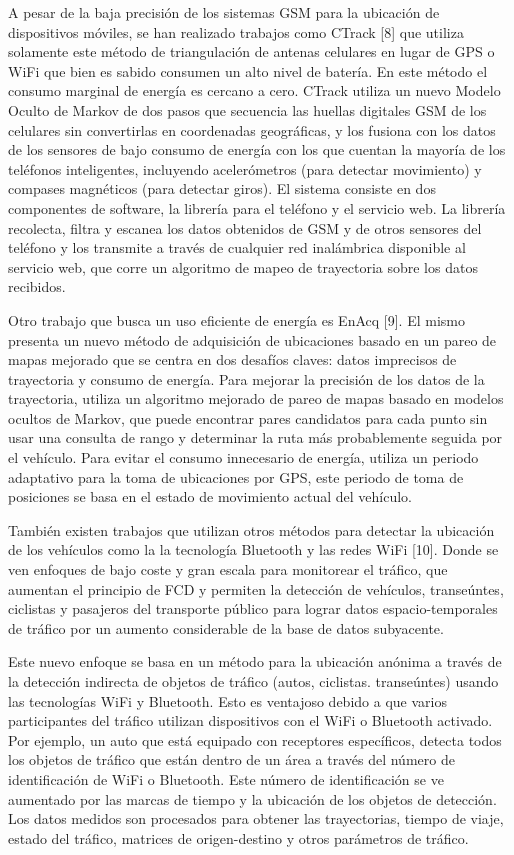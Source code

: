 A pesar de la baja precisión de los sistemas GSM para la ubicación de dispositivos móviles, se han realizado trabajos como CTrack [8] que utiliza solamente este método de triangulación de antenas celulares en lugar de GPS o WiFi que bien es sabido consumen un alto nivel de batería. En este método el consumo marginal de energía es cercano a cero. CTrack utiliza un nuevo Modelo Oculto de Markov de dos pasos que secuencia las huellas digitales GSM de los celulares sin convertirlas en coordenadas geográficas, y los fusiona con los datos de los sensores de bajo consumo de energía con los que cuentan la mayoría de los teléfonos inteligentes, incluyendo acelerómetros (para detectar movimiento) y compases magnéticos (para detectar giros). El sistema consiste en dos componentes de software, la librería para el teléfono y el servicio web. La librería recolecta, filtra y escanea los datos obtenidos de GSM y de otros sensores del teléfono y los transmite a través de cualquier red inalámbrica disponible al servicio web, que corre un algoritmo de mapeo de trayectoria sobre los datos recibidos.

Otro trabajo que busca un uso eficiente de energía es EnAcq [9]. El mismo presenta un nuevo método de adquisición de ubicaciones basado en un pareo de mapas mejorado que se centra en dos desafíos claves: datos imprecisos de trayectoria y consumo de energía. Para mejorar la precisión de los datos de la trayectoria, utiliza un algoritmo mejorado de pareo de mapas basado en modelos ocultos de Markov, que puede encontrar pares candidatos para cada punto sin usar una consulta de rango y determinar la ruta más probablemente seguida por el vehículo. Para evitar el consumo innecesario de energía, utiliza un periodo adaptativo para la toma de ubicaciones por GPS, este periodo de toma de posiciones se basa en el estado de movimiento actual del vehículo.

También existen trabajos que utilizan otros métodos para detectar la ubicación de los vehículos como la la tecnología Bluetooth y las redes WiFi [10]. Donde se ven enfoques de bajo coste y gran escala para monitorear el tráfico, que aumentan el principio de FCD y permiten la detección de vehículos, transeúntes, ciclistas y pasajeros del transporte público para lograr datos espacio-temporales de tráfico por un aumento considerable de la base de datos subyacente. 

Este nuevo enfoque se basa en un método para la ubicación anónima a través de la detección indirecta de objetos de tráfico (autos, ciclistas. transeúntes) usando las tecnologías WiFi y Bluetooth. Esto es ventajoso debido a que varios participantes del tráfico utilizan dispositivos con el WiFi o Bluetooth activado. Por ejemplo, un auto que está equipado con receptores específicos, detecta todos los objetos de tráfico que están dentro de un área a través del número de identificación de WiFi o Bluetooth. Este número de identificación se ve aumentado por las marcas de tiempo y la ubicación de los objetos de detección. Los datos medidos son procesados para obtener las trayectorias, tiempo de viaje, estado del tráfico, matrices de origen-destino y otros parámetros de tráfico.

